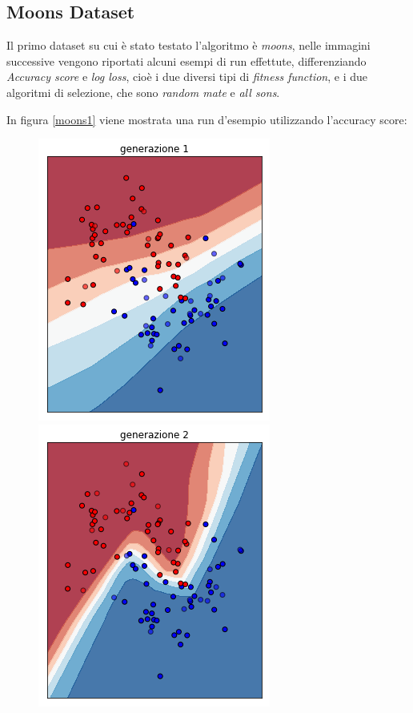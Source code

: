 \documentclass[12pt,a4paper]{report}
\begin{document}
\subsection{Moons Dataset}

Il primo dataset su cui è stato testato l'algoritmo è \textit{moons}, nelle immagini successive vengono riportati alcuni esempi di run effettute, differenziando \textit{Accuracy score} e \textit{log loss}, cioè i due diversi tipi di \textit{fitness function}, e i due algoritmi di selezione, che sono \textit{random mate} e \textit{all sons}.

In figura \ref{moons1} viene mostrata una run d'esempio utilizzando l'accuracy score:

\begin{figure}[H]
 \centering
 \includegraphics[scale = 0.4]{images/moons-rnd-acc./1}
 \includegraphics[scale = 0.4]{images/moons-rnd-acc./2}

\end{figure}
\end{document}
